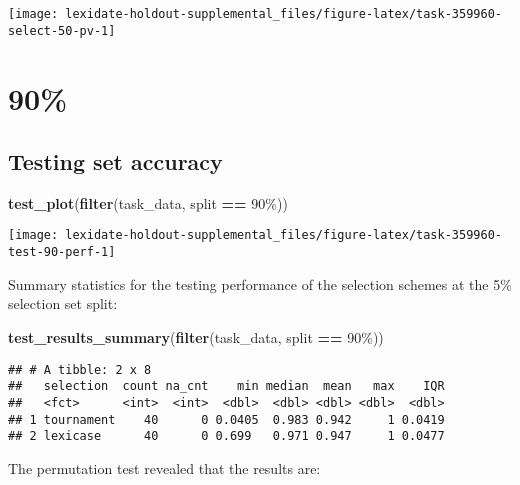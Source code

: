 \documentclass[
]{book}
\newenvironment{Shaded}{\begin{snugshade}}{\end{snugshade}}
\newcommand{\FunctionTok}[1]{\textcolor[rgb]{0.13,0.29,0.53}{\textbf{#1}}}
\newcommand{\NormalTok}[1]{#1}
\newcommand{\SpecialCharTok}[1]{\textcolor[rgb]{0.81,0.36,0.00}{\textbf{#1}}}
\newcommand{\StringTok}[1]{\textcolor[rgb]{0.31,0.60,0.02}{#1}}
\begin{document}
\texttt{[image: lexidate-holdout-supplemental\_files/figure-latex/task-359960-select-50-pv-1]}

\hypertarget{section-48}{%
\section{90\%}\label{section-48}}

\hypertarget{testing-set-accuracy-48}{%
\subsection{Testing set accuracy}\label{testing-set-accuracy-48}}

\begin{Shaded}
\begin{Highlighting}[]
\FunctionTok{test\_plot}\NormalTok{(}\FunctionTok{filter}\NormalTok{(task\_data, split }\SpecialCharTok{==} \StringTok{\textquotesingle{}90\%\textquotesingle{}}\NormalTok{))}
\end{Highlighting}
\end{Shaded}

\texttt{[image: lexidate-holdout-supplemental\_files/figure-latex/task-359960-test-90-perf-1]}

Summary statistics for the testing performance of the selection schemes at the 5\% selection set split:

\begin{Shaded}
\begin{Highlighting}[]
\FunctionTok{test\_results\_summary}\NormalTok{(}\FunctionTok{filter}\NormalTok{(task\_data, split }\SpecialCharTok{==} \StringTok{\textquotesingle{}90\%\textquotesingle{}}\NormalTok{))}
\end{Highlighting}
\end{Shaded}

\begin{verbatim}
## # A tibble: 2 x 8
##   selection  count na_cnt    min median  mean   max    IQR
##   <fct>      <int>  <int>  <dbl>  <dbl> <dbl> <dbl>  <dbl>
## 1 tournament    40      0 0.0405  0.983 0.942     1 0.0419
## 2 lexicase      40      0 0.699   0.971 0.947     1 0.0477
\end{verbatim}

The permutation test revealed that the results are:
\end{document}
